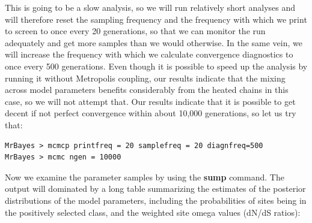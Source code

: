 \documentclass[12pt]{book}
\begin{document}
This is going to be a slow analysis, so we will run relatively short analyses and will therefore reset the sampling
frequency and the frequency with which we print to screen to once every 20 generations, so that we can monitor
the run adequately and get more samples than we would otherwise. In the same vein, we will increase the frequency
with which we calculate convergence diagnostics to once every 500 generations. Even though it is possible to speed
up the analysis by running it without Metropolis coupling, our results indicate that the mixing across model parameters
benefits considerably from the heated chains in this case, so we will not attempt that. Our results indicate that it
is possible to get decent if not perfect convergence within about 10,000 generations, so let us try that:

\begin{singlespacing}
\begin{verbatim}
MrBayes > mcmcp printfreq = 20 samplefreq = 20 diagnfreq=500
MrBayes > mcmc ngen = 10000
\end{verbatim}
\end{singlespacing}

Now we examine the parameter samples by using the \textbf{sump} command. The output will dominated by a long
table summarizing the estimates of the posterior distributions of the model parameters, including the probabilities
of sites being in the positively selected class, and the weighted site omega values (dN/dS ratios):
\end{document}
